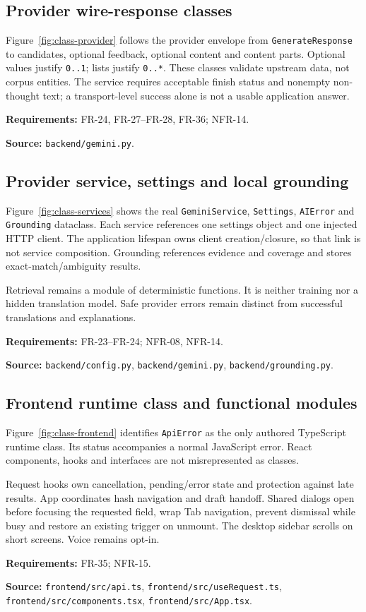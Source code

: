 \documentclass[11pt,a4paper]{article}
\newcommand{\viewtrace}[2]{\par\smallskip\noindent\textbf{Requirements:} #1.\par
  \noindent\textbf{Source:} #2.\par\medskip}
\begin{document}
\subsection{Provider wire-response classes}
Figure~\ref{fig:class-provider} follows the provider envelope from
\texttt{GenerateResponse} to candidates, optional feedback, optional content
and content parts. Optional values justify \texttt{0..1}; lists justify
\texttt{0..*}. These classes validate upstream data, not corpus entities.
The service requires acceptable finish status and nonempty non-thought text;
a transport-level success alone is not a usable application answer.
\viewtrace{FR-24, FR-27--FR-28, FR-36; NFR-14}{\nolinkurl{backend/gemini.py}}

\subsection{Provider service, settings and local grounding}
Figure~\ref{fig:class-services} shows the real \texttt{GeminiService},
\texttt{Settings}, \texttt{AIError} and \texttt{Grounding} dataclass.
Each service references one settings object and one injected HTTP client.
The application lifespan owns client creation/closure, so that link is not
service composition. Grounding references evidence and coverage and stores
exact-match/ambiguity results.

Retrieval remains a module of deterministic functions. It is neither training
nor a hidden translation model. Safe provider errors remain distinct from
successful translations and explanations.
\viewtrace{FR-23--FR-24; NFR-08, NFR-14}
{\nolinkurl{backend/config.py}, \nolinkurl{backend/gemini.py}, \nolinkurl{backend/grounding.py}}

\subsection{Frontend runtime class and functional modules}
Figure~\ref{fig:class-frontend} identifies \texttt{ApiError} as the only authored
TypeScript runtime class. Its status accompanies a normal JavaScript error.
React components, hooks and interfaces are not misrepresented as classes.

Request hooks own cancellation, pending/error state and protection against
late results. App coordinates hash navigation and draft handoff. Shared
dialogs open before focusing the requested field, wrap Tab navigation, prevent
dismissal while busy and restore an existing trigger on unmount. The desktop
sidebar scrolls on short screens. Voice remains opt-in.
\viewtrace{FR-35; NFR-15}
{\nolinkurl{frontend/src/api.ts}, \nolinkurl{frontend/src/useRequest.ts},
\nolinkurl{frontend/src/components.tsx}, \nolinkurl{frontend/src/App.tsx}}
\end{document}

